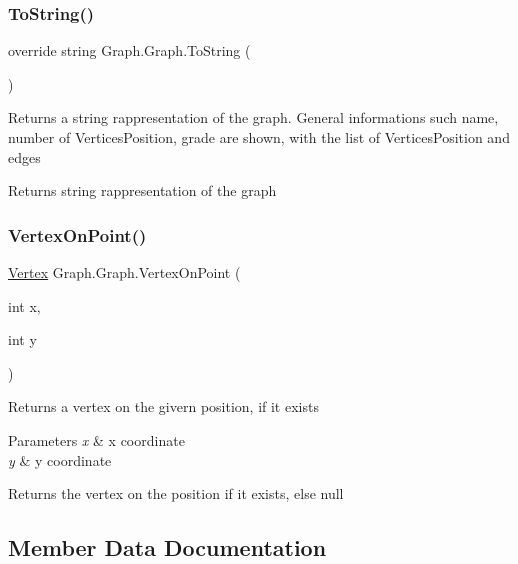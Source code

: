 \subsubsection{\texorpdfstring{To\+String()}{ToString()}}
{\footnotesize\ttfamily override string Graph.\+Graph.\+To\+String (\begin{DoxyParamCaption}{ }\end{DoxyParamCaption})}



Returns a string rappresentation of the graph. General informations such name, number of Vertices\+Position, grade are shown, with the list of Vertices\+Position and edges 

\begin{DoxyReturn}{Returns}
string rappresentation of the graph
\end{DoxyReturn}
\mbox{\label{class_graph_1_1_graph_a3916416db4cf90b2afee5e7162c29875}} 
\subsubsection{\texorpdfstring{Vertex\+On\+Point()}{VertexOnPoint()}}
{\footnotesize\ttfamily \hyperlink{class_graph_1_1_vertex}{Vertex} Graph.\+Graph.\+Vertex\+On\+Point (\begin{DoxyParamCaption}\item[{int}]{x,  }\item[{int}]{y }\end{DoxyParamCaption})}



Returns a vertex on the givern position, if it exists 


\begin{DoxyParams}{Parameters}
{\em x} & x coordinate\\
\hline
{\em y} & y coordinate\\
\hline
\end{DoxyParams}
\begin{DoxyReturn}{Returns}
the vertex on the position if it exists, else null
\end{DoxyReturn}


\subsection{Member Data Documentation}
\mbox{\label{class_graph_1_1_graph_a0daa42ad862bce4e14dca2652b565dc9}} 
